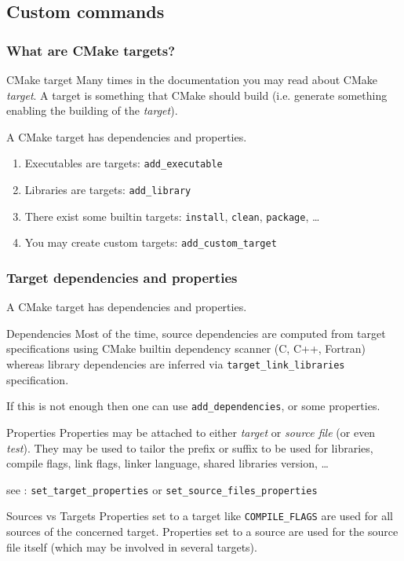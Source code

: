 \documentclass[compress,slidestop,table
              ]
               {beamer}
\newcommand{\fname}[1]{\texttt{#1}}
\begin{document}
\subsection{Custom commands}
\begin{frame}[fragile]
\frametitle{What are CMake targets?}
\begin{block}{CMake target}
Many times in the documentation you may read about CMake \emph{target}.
A target is something that CMake should build (i.e. generate something
enabling the building of the \emph{target}).

A CMake target has \alert{dependencies} and \alert{properties}.
\end{block}
\begin{enumerate}
\item Executables are targets: \lstinline!add_executable!
\item Libraries are targets: \lstinline!add_library!
\item There exist some builtin targets: \fname{install}, \fname{clean}, \fname{package}, \ldots
\item You may create custom targets: \lstinline!add_custom_target!
\end{enumerate}
\end{frame}

\begin{frame}
\frametitle{Target dependencies and properties}
A CMake target has \alert{dependencies} and \alert{properties}.
\begin{block}{Dependencies}
Most of the time, source dependencies are computed from target specifications
using CMake builtin dependency scanner (C, C++, Fortran)
whereas library dependencies
are inferred via \lstinline!target_link_libraries! specification.
\end{block}
If this is not enough then one can use \lstinline!add_dependencies!,
or some properties.
\begin{block}{Properties}
Properties may be attached to either \emph{target} or \emph{source file}
(or even \emph{test}).
They may be used to tailor the prefix or suffix to be used for libraries,
compile flags, link flags, linker language, shared libraries version,
\ldots
\end{block}
\vspace*{-0.3cm}
see : \lstinline!set_target_properties! or \lstinline!set_source_files_properties!
\vspace*{-0.3cm}
\begin{alertblock}{Sources vs Targets}
Properties set to a target like \lstinline!COMPILE_FLAGS! are used
for all sources of the concerned target. Properties set to a source
are used for the source file itself (which may be involved in several targets).
\end{alertblock}
\end{frame}
\end{document}
